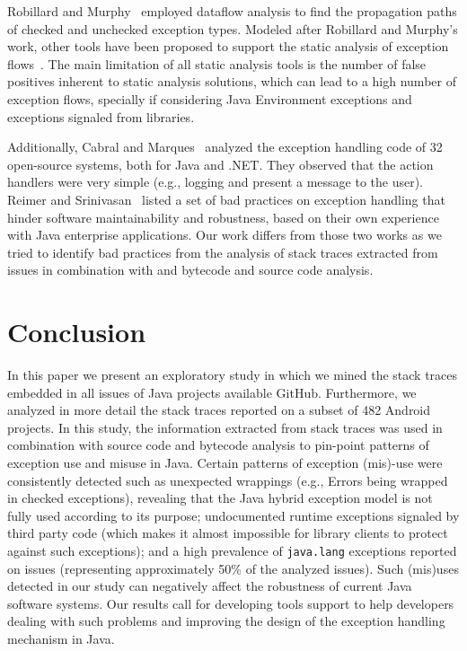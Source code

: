 \documentclass[conference]{IEEEtran}
\begin{document}
Robillard and Murphy~\cite{Robil00}
employed dataflow analysis to find the propagation paths of checked and
unchecked exception types. Modeled after Robillard and Murphy's work, other
tools have been proposed to support the static analysis of exception
flows~\cite{coelho2008assessing}. The main limitation of all
static analysis tools is the number of false positives inherent to static analysis
solutions, which can lead to a high number of exception flows, specially if
considering Java Environment exceptions and exceptions signaled from libraries.
 
Additionally, Cabral and Marques~\cite{cabral2007exception} analyzed the
exception handling code of 32 open-source systems, both for Java and .NET. They
observed that the action handlers were very simple (e.g., logging and present a
message to the user). Reimer and Srinivasan~\cite{reimer2003analyzing} listed a
set of bad practices on exception handling that hinder software maintainability
and robustness, based on their own experience with Java enterprise applications.
Our work differs from those two works as we tried to identify bad practices from
the analysis of stack traces extracted from issues in combination with and bytecode and source
code analysis. 


\enlargethispage{-2\baselineskip}

\section{Conclusion}

In this paper we present an exploratory study in which we mined the stack 
traces embedded in all issues of Java projects available GitHub.
Furthermore, we analyzed in more detail the
stack traces reported on a subset of 482 Android projects. In this study, the information extracted 
from stack traces was used in combination with source code and bytecode analysis to 
pin-point patterns of exception use and misuse in Java.
Certain patterns of exception
(mis)-use were consistently detected such as unexpected wrappings (e.g., Errors
being wrapped in checked exceptions), revealing that  the Java hybrid exception
model is not fully used according to its purpose; undocumented runtime
exceptions signaled by third party code (which makes it almost impossible for
library clients to protect against such exceptions); 
and a high prevalence of
\texttt{java.lang} exceptions reported on issues (representing approximately 50\% of the
analyzed issues). Such (mis)uses detected in our study can negatively affect the 
robustness of current Java software systems. Our results call for  
 developing tools support to help developers dealing with such problems and 
improving the design of the exception handling mechanism in Java.
\end{document}
